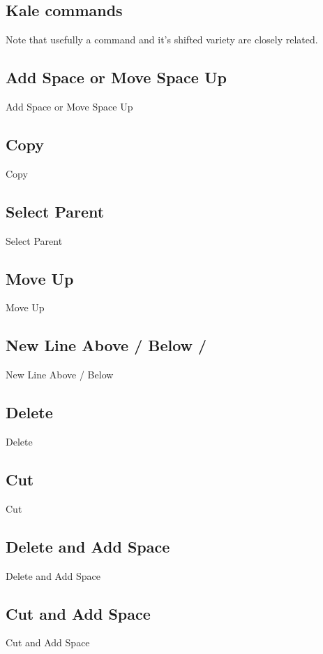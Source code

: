 \documentclass[11pt]{report}
\begin{document}
\begin{appendices}
\chapter{Kale commands}
\newcommand{\shortcut}[2]{\section[#1]{#1 \hfill #2}}

Note that usefully a command and it's shifted \keys{\shift} variety are closely
related.

\shortcut{Add Space or Move Space Up}{\keys{\SPACE}}
Add Space or Move Space Up

\shortcut{Copy}{}
Copy

\shortcut{Select Parent}{}
Select Parent

\shortcut{Move Up}{}
Move Up

\shortcut{New Line Above / Below}{ / }
New Line Above / Below

\shortcut{Delete}{\keys{\backspace}}
Delete

\shortcut{Cut}{}
Cut

\shortcut{Delete and Add Space}{}
Delete and Add Space

\shortcut{Cut and Add Space}{}
Cut and Add Space


\end{appendices}
\end{document}
